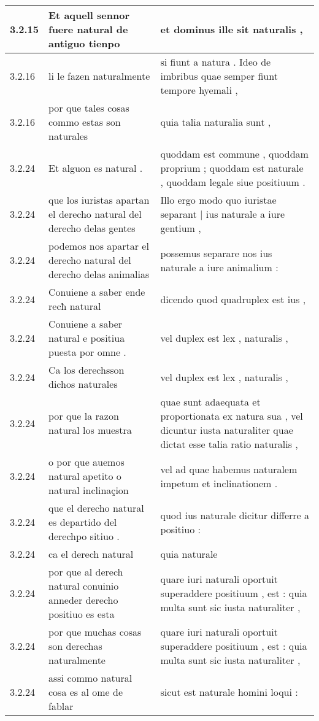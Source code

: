 \begin{tabular}{|p{1cm}|p{6.5cm}|p{6.5cm}|}
3.2.15 & Et aquell sennor fuere natural de antiguo tienpo & et dominus ille sit naturalis , \\\hline
3.2.16 & li le fazen naturalmente & si fiunt a natura . Ideo de imbribus quae semper fiunt tempore hyemali , \\\hline
3.2.16 & por que tales cosas commo estas son naturales & quia talia naturalia sunt , \\\hline
3.2.24 & Et alguon es natural . & quoddam est commune , quoddam proprium ; quoddam est naturale , quoddam legale siue positiuum . \\\hline
3.2.24 & que los iuristas apartan el derecho natural del derecho delas gentes & Illo ergo modo quo iuristae separant | ius naturale a iure gentium , \\\hline
3.2.24 & podemos nos apartar el derecho natural del derecho delas animalias & possemus separare nos ius naturale a iure animalium : \\\hline
3.2.24 & Conuiene a saber ende recħ natural & dicendo quod quadruplex est ius , \\\hline
3.2.24 & Conuiene a saber natural e positiua puesta por omne . & vel duplex est lex , naturalis , \\\hline
3.2.24 & Ca los derechsson dichos naturales & vel duplex est lex , naturalis , \\\hline
3.2.24 & por que la razon natural los muestra & quae sunt adaequata et proportionata ex natura sua , vel dicuntur iusta naturaliter quae dictat esse talia ratio naturalis , \\\hline
3.2.24 & o por que auemos natural apetito o natural inclinaçion & vel ad quae habemus naturalem impetum et inclinationem . \\\hline
3.2.24 & que el derecho natural es departido del derechpo sitiuo . & quod ius naturale dicitur differre a positiuo : \\\hline
3.2.24 & ca el derech natural & quia naturale \\\hline
3.2.24 & por que al derech natural conuinio anneder derecho positiuo es esta & quare iuri naturali oportuit superaddere positiuum , est : quia multa sunt sic iusta naturaliter , \\\hline
3.2.24 & por que muchas cosas son derechas naturalmente & quare iuri naturali oportuit superaddere positiuum , est : quia multa sunt sic iusta naturaliter , \\\hline
3.2.24 & assi commo natural cosa es al ome de fablar & sicut est naturale homini loqui : \\\hline

\end{tabular}
